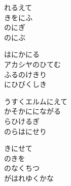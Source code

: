 \documentclass[10pt,b5j]{tarticle} %
\begin{document}
\vspace{1.5em} %
\newcommand{\linespace}{0.5em} %
\newcommand{\blocksize}{0.5\hsize} %
\begin{enumerate} %
    \begin{minipage}[c]{\blocksize}
    
        \vspace{\linespace}
        \item
        れるえて\\
        きをにふ\\
        のにぎ\\
        のにぶ
        
        \vspace{\linespace}
        \item
        はにかにる\\
        アカシヤのひてむ\\
        ふるのけきり\\
        にひびくしき
        
        \vspace{\linespace}
        \item
        うすくエルムにえて\\
        かそかににながる\\
        らひけるぎ\\
        のらはにせり
        
        \vspace{\linespace}
        \item
        きにせて\\
        のきを\\
        のなくちつ\\
        がはれゆくかな
        

\end{minipage}
\end{enumerate}
\end{document}
